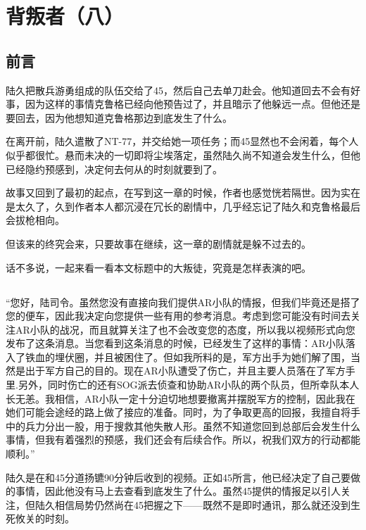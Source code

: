 \chapter{背叛者（八）}

\section*{前言}


陆久把散兵游勇组成的队伍交给了45，然后自己去单刀赴会。他知道回去不会有好事，因为这样的事情克鲁格已经向他预告过了，并且暗示了他躲远一点。但他还是要回去，因为他想知道克鲁格那边到底发生了什么。

在离开前，陆久遣散了NT-77，并交给她一项任务；而45显然也不会闲着，每个人似乎都很忙。悬而未决的一切即将尘埃落定，虽然陆久尚不知道会发生什么，但他已经隐约预感到，决定何去何从的时刻就要到了。

\lineseparator


故事又回到了最初的起点，在写到这一章的时候，作者也感觉恍若隔世。因为实在是太久了，久到作者本人都沉浸在冗长的剧情中，几乎经忘记了陆久和克鲁格最后会拔枪相向。

但该来的终究会来，只要故事在继续，这一章的剧情就是躲不过去的。

话不多说，一起来看一看本文标题中的大叛徒，究竟是怎样表演的吧。

\section*{}

“您好，陆司令。虽然您没有直接向我们提供AR小队的情报，但我们毕竟还是搭了您的便车，因此我决定向您提供一些有用的参考消息。考虑到您可能没有时间去关注AR小队的战况，而且就算关注了也不会改变您的态度，所以我以视频形式向您发布了这条消息。当您看到这条消息的时候，已经发生了这样的事情：AR小队落入了铁血的埋伏圈，并且被困住了。但如我所料的是，军方出手为她们解了围，当然是出于军方自己的目的。现在AR小队遭受了伤亡，并且主要人员落在了军方手里.另外，同时伤亡的还有SOG派去侦查和协助AR小队的两个队员，但所幸队本人长无恙。我相信，AR小队一定十分迫切地想要撤离并摆脱军方的控制，因此我在她们可能会途经的路上做了接应的准备。同时，为了争取更高的回报，我擅自将手中的兵力分出一股，用于搜救其他失散人形。虽然不知道您回到总部后会发生什么事情，但我有着强烈的预感，我们还会有后续合作。所以，祝我们双方的行动都能顺利。”

陆久是在和45分道扬镳90分钟后收到的视频。正如45所言，他已经决定了自己要做的事情，因此他没有马上去查看到底发生了什么。虽然45提供的情报足以引人关注，但陆久相信局势仍然尚在45把握之下——既然不是即时通讯，那么就还没到生死攸关的时刻。

